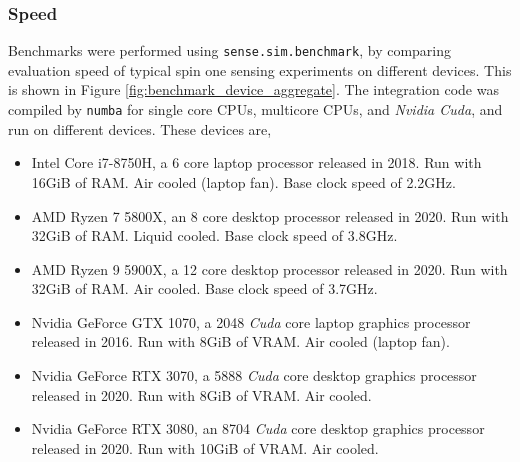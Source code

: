 \documentclass{jors}
\begin{document}
		\subsubsection*{Speed}
			Benchmarks were performed using \texttt{sense.sim.benchmark}, by comparing evaluation speed of typical spin one sensing experiments on different devices. This is shown in Figure \ref{fig:benchmark_device_aggregate}. The integration code was compiled by \texttt{numba} for single core CPUs, multicore CPUs, and \emph{Nvidia Cuda}, and run on different devices. These devices are,
			\begin{itemize}
				\item {} 
				Intel Core i7-8750H, a 6 core laptop processor released in 2018. Run with 16GiB of RAM. Air cooled (laptop fan). Base clock speed of 2.2GHz.

				\item {} 
				AMD Ryzen 7 5800X, an 8 core desktop processor released in 2020. Run with 32GiB of RAM. Liquid cooled. Base clock speed of 3.8GHz.

				\item {} 
				AMD Ryzen 9 5900X, a 12 core desktop processor released in 2020. Run with 32GiB of RAM. Air cooled. Base clock speed of 3.7GHz.

				\item {} 
				Nvidia GeForce GTX 1070, a 2048 \emph{Cuda} core laptop graphics processor released in 2016. Run with 8GiB of VRAM. Air cooled (laptop fan).

				\item {} 
				Nvidia GeForce RTX 3070, a 5888 \emph{Cuda} core desktop graphics processor released in 2020. Run with 8GiB of VRAM. Air cooled.

				\item {} 
				Nvidia GeForce RTX 3080, an 8704 \emph{Cuda} core desktop graphics processor released in 2020. Run with 10GiB of VRAM. Air cooled.
			\end{itemize}
\end{document}
